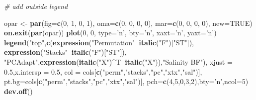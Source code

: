 \documentclass[11pt,]{article}
\newenvironment{Shaded}{\begin{snugshade}}{\end{snugshade}}
\newcommand{\KeywordTok}[1]{\textcolor[rgb]{0.13,0.29,0.53}{\textbf{#1}}}
\newcommand{\DataTypeTok}[1]{\textcolor[rgb]{0.13,0.29,0.53}{#1}}
\newcommand{\DecValTok}[1]{\textcolor[rgb]{0.00,0.00,0.81}{#1}}
\newcommand{\FloatTok}[1]{\textcolor[rgb]{0.00,0.00,0.81}{#1}}
\newcommand{\StringTok}[1]{\textcolor[rgb]{0.31,0.60,0.02}{#1}}
\newcommand{\CommentTok}[1]{\textcolor[rgb]{0.56,0.35,0.01}{\textit{#1}}}
\newcommand{\OtherTok}[1]{\textcolor[rgb]{0.56,0.35,0.01}{#1}}
\newcommand{\OperatorTok}[1]{\textcolor[rgb]{0.81,0.36,0.00}{\textbf{#1}}}
\newcommand{\NormalTok}[1]{#1}
\begin{document}
\begin{Shaded}
\begin{Highlighting}[]
\CommentTok{# add outside legend}

\NormalTok{opar <-}\StringTok{ }\KeywordTok{par}\NormalTok{(}\DataTypeTok{fig=}\KeywordTok{c}\NormalTok{(}\DecValTok{0}\NormalTok{, }\DecValTok{1}\NormalTok{, }\DecValTok{0}\NormalTok{, }\DecValTok{1}\NormalTok{), }\DataTypeTok{oma=}\KeywordTok{c}\NormalTok{(}\DecValTok{0}\NormalTok{, }\DecValTok{0}\NormalTok{, }\DecValTok{0}\NormalTok{, }\DecValTok{0}\NormalTok{),}
            \DataTypeTok{mar=}\KeywordTok{c}\NormalTok{(}\DecValTok{0}\NormalTok{, }\DecValTok{0}\NormalTok{, }\DecValTok{0}\NormalTok{, }\DecValTok{0}\NormalTok{), }\DataTypeTok{new=}\OtherTok{TRUE}\NormalTok{)}
\KeywordTok{on.exit}\NormalTok{(}\KeywordTok{par}\NormalTok{(opar))}
\KeywordTok{plot}\NormalTok{(}\DecValTok{0}\NormalTok{, }\DecValTok{0}\NormalTok{, }\DataTypeTok{type=}\StringTok{'n'}\NormalTok{, }\DataTypeTok{bty=}\StringTok{'n'}\NormalTok{, }\DataTypeTok{xaxt=}\StringTok{'n'}\NormalTok{, }\DataTypeTok{yaxt=}\StringTok{'n'}\NormalTok{)}
\KeywordTok{legend}\NormalTok{(}\StringTok{"top"}\NormalTok{,}\KeywordTok{c}\NormalTok{(}\KeywordTok{expression}\NormalTok{(}\StringTok{"Permutation"}\OperatorTok{~}\KeywordTok{italic}\NormalTok{(}\StringTok{"F"}\NormalTok{)[}\StringTok{"ST"}\NormalTok{]),}
         \KeywordTok{expression}\NormalTok{(}\StringTok{"Stacks"}\OperatorTok{~}\KeywordTok{italic}\NormalTok{(}\StringTok{"F"}\NormalTok{)[}\StringTok{"ST"}\NormalTok{]),}
         \StringTok{"PCAdapt"}\NormalTok{,}\KeywordTok{expression}\NormalTok{(}\KeywordTok{italic}\NormalTok{(}\StringTok{"X"}\NormalTok{)}\OperatorTok{^}\NormalTok{T}\OperatorTok{~}\KeywordTok{italic}\NormalTok{(}\StringTok{"X"}\NormalTok{)),}\StringTok{"Salinity BF"}\NormalTok{),}
       \DataTypeTok{xjust =} \FloatTok{0.5}\NormalTok{,}\DataTypeTok{x.intersp =} \FloatTok{0.5}\NormalTok{,}
       \DataTypeTok{col =}\NormalTok{ cols[}\KeywordTok{c}\NormalTok{(}\StringTok{"perm"}\NormalTok{,}\StringTok{"stacks"}\NormalTok{,}\StringTok{"pc"}\NormalTok{,}\StringTok{"xtx"}\NormalTok{,}\StringTok{"sal"}\NormalTok{)],}
       \DataTypeTok{pt.bg=}\NormalTok{cols[}\KeywordTok{c}\NormalTok{(}\StringTok{"perm"}\NormalTok{,}\StringTok{"stacks"}\NormalTok{,}\StringTok{"pc"}\NormalTok{,}\StringTok{"xtx"}\NormalTok{,}\StringTok{"sal"}\NormalTok{)],}
       \DataTypeTok{pch=}\KeywordTok{c}\NormalTok{(}\DecValTok{4}\NormalTok{,}\DecValTok{5}\NormalTok{,}\DecValTok{0}\NormalTok{,}\DecValTok{3}\NormalTok{,}\DecValTok{2}\NormalTok{),}\DataTypeTok{bty=}\StringTok{'n'}\NormalTok{,}\DataTypeTok{ncol=}\DecValTok{5}\NormalTok{)}
\KeywordTok{dev.off}\NormalTok{()}
\end{Highlighting}
\end{Shaded}
\end{document}
